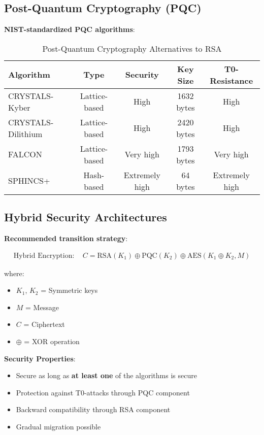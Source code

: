 \documentclass[12pt,a4paper]{article}
\begin{document}
	\subsection{Post-Quantum Cryptography (PQC)}
	
	\textbf{NIST-standardized PQC algorithms}:
	
	\begin{table}[htbp]
		\centering
		\begin{tabular}{lcccc}
			\toprule
			\textbf{Algorithm} & \textbf{Type} & \textbf{Security} & \textbf{Key Size} & \textbf{T0-Resistance} \\
			\midrule
			CRYSTALS-Kyber & Lattice-based & High & 1632 bytes & High \\
			CRYSTALS-Dilithium & Lattice-based & High & 2420 bytes & High \\
			FALCON & Lattice-based & Very high & 1793 bytes & Very high \\
			SPHINCS+ & Hash-based & Extremely high & 64 bytes & Extremely high \\
			\bottomrule
		\end{tabular}
		\caption{Post-Quantum Cryptography Alternatives to RSA}
		\label{tab:pqc_alternatives}
	\end{table}
	
	\subsection{Hybrid Security Architectures}
	
	\textbf{Recommended transition strategy}:
	
	\begin{align}
		\text{Hybrid Encryption}: \quad C = \text{RSA}(K_1) \oplus \text{PQC}(K_2) \oplus \text{AES}(K_1 \oplus K_2, M)
	\end{align}
	
	where:
	\begin{itemize}
		\item $K_1$, $K_2$ = Symmetric keys
		\item $M$ = Message
		\item $C$ = Ciphertext
		\item $\oplus$ = XOR operation
	\end{itemize}
	
	\textbf{Security Properties}:
	\begin{itemize}
		\item Secure as long as \textbf{at least one} of the algorithms is secure
		\item Protection against T0-attacks through PQC component
		\item Backward compatibility through RSA component
		\item Gradual migration possible
	\end{itemize}
	
\end{document}
